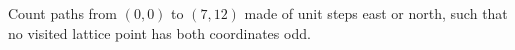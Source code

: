 Count paths from $(0,0)$ to $(7,12)$ made of unit steps east or north, such that no visited lattice point has both coordinates odd.
